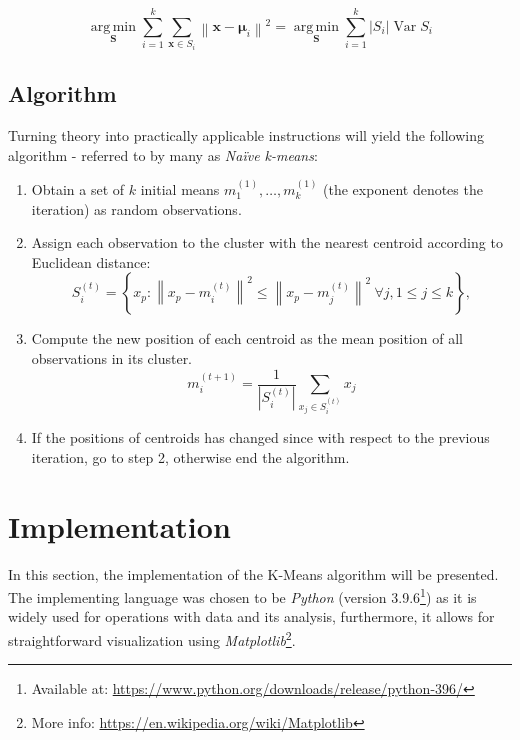 \documentclass[a4paper]{article}
\begin{document}
\begin{equation}\label{equation:formal-wcss}
	{\displaystyle {\underset {\mathbf {S} }{\operatorname {arg\,min} }}\sum _{i=1}^{k}\sum _{\mathbf {x} \in S_{i}}\left\|\mathbf {x} -{\boldsymbol {\mu }}_{i}\right\|^{2}={\underset {\mathbf {S} }{\operatorname {arg\,min} }}\sum _{i=1}^{k}|S_{i}|\operatorname {Var} S_{i}}
\end{equation}

\subsection{Algorithm}
Turning theory into practically applicable instructions will yield the following algorithm - referred to by many as \textit{Naïve k-means}:
\begin{enumerate}
	\item Obtain a set of $ k $ initial means $ m_1^{(1)}, \ldots, m_k^{(1)} $ (the exponent denotes the iteration) as random observations.
	\item Assign each observation to the cluster with the nearest centroid according to Euclidean distance:\newline
		\begin{equation}\label{equation:algo-assignment-step}
			{\displaystyle S_{i}^{(t)}=\left\{x_{p}:\left\|x_{p}-m_{i}^{(t)}\right\|^{2}\leq \left\|x_{p}-m_{j}^{(t)}\right\|^{2}\ \forall j,1\leq j\leq k\right\},}
		\end{equation}
	\item Compute the new position of each centroid as the mean position of all observations in its cluster.
		\begin{equation}\label{equation:algo-update-step}
			{\displaystyle m_{i}^{(t+1)}={\frac {1}{\left|S_{i}^{(t)}\right|}}\sum _{x_{j}\in S_{i}^{(t)}}x_{j}}
		\end{equation}
	\item If the positions of centroids has changed since with respect to the previous iteration, go to step 2, otherwise end the algorithm.
\end{enumerate}





\section{Implementation}\label{section:implementation}
In this section, the implementation of the K-Means algorithm will be presented. The implementing language was chosen to be \textit{Python} (version 3.9.6\footnote{Available at: \url{https://www.python.org/downloads/release/python-396/}}) as it is widely used for operations with data and its analysis, furthermore, it allows for straightforward visualization using \textit{Matplotlib}\footnote{More info: \url{https://en.wikipedia.org/wiki/Matplotlib}}.
\end{document}

